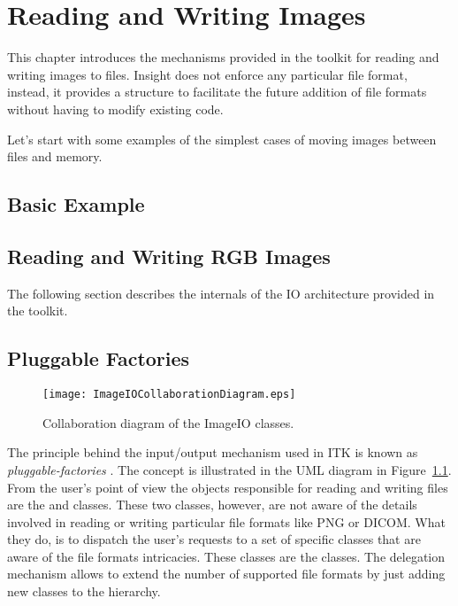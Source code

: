 

\chapter{Reading and Writing Images}
\label{sec:IO}

This chapter introduces the mechanisms provided in the toolkit for reading and
writing images to files. Insight does not enforce any particular file format,
instead, it provides a structure to facilitate the future addition of file
formats without having to modify existing code. 

Let's start with some examples of the simplest cases of moving images between files
and memory.

\section{Basic Example}
\label{sec:ImagReadWrite}


\section{Reading and Writing RGB Images}
\label{sec:RGBImagReadWrite}



The following section describes the internals of the IO architecture provided
in the toolkit.

\section{Pluggable Factories}
\label{sec:ImageIOPluggableFactories}

\begin{figure}
\center
\texttt{[image: ImageIOCollaborationDiagram.eps]}
\caption{Collaboration diagram of the ImageIO classes.}
\label{fig:ImageIOCollaborationDiagram}
\end{figure}


The principle behind the input/output mechanism used in ITK is known as
\emph{pluggable-factories} \cite{Gamma1995}. The concept is illustrated in the
UML diagram in Figure~\ref{fig:ImageIOCollaborationDiagram}. From the user's
point of view the objects responsible for reading and writing files are the
 and  classes. These two
classes, however, are not aware of the details involved in reading or writing
particular file formats like PNG or DICOM.  What they do, is to dispatch the
user's requests to a set of specific classes that are aware of the file formats
intricacies. These classes are the  classes. The delegation mechanism
allows to extend the number of supported file formats by just adding new
classes to the  hierarchy.

